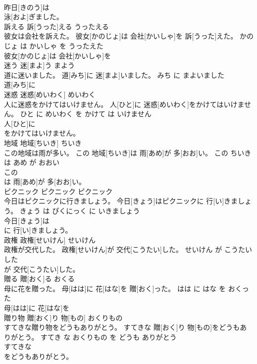 \documentclass[8pt]{extreport}
\begin{document}
\begin{CJK}{UTF8}{min}
\\	昨日[きのう]は
\\	泳[およ]ぎました。			
\\	訴える	訴[うった]える	うったえる	
\\	彼女は会社を訴えた。	彼女[かのじょ]は 会社[かいしゃ]を 訴[うった]えた。	かのじょ は かいしゃ を うったえた	
\\	彼女[かのじょ]は 会社[かいしゃ]を
\\	迷う	迷[まよ]う	まよう	
\\	道に迷いました。	道[みち]に 迷[まよ]いました。	みち に まよいました	
\\	道[みち]に
\\	迷惑	迷惑[めいわく]	めいわく	
\\	人に迷惑をかけてはいけません。	人[ひと]に 迷惑[めいわく]をかけてはいけません。	ひと に めいわく を かけて は いけません	
\\	人[ひと]に
\\	をかけてはいけません。			
\\	地域	地域[ちいき]	ちいき	
\\	この地域は雨が多い。	この 地域[ちいき]は 雨[あめ]が 多[おお]い。	この ちいき は あめ が おおい	
\\	この
\\	は 雨[あめ]が 多[おお]い。			
\\	ピクニック	ピクニック	ピクニック	
\\	今日はピクニックに行きましょう。	今日[きょう]はピクニックに 行[い]きましょう。	きょう は ぴくにっく に いきましょう	
\\	今日[きょう]は
\\	に 行[い]きましょう。			
\\	政権	政権[せいけん]	せいけん	
\\	政権が交代した。	政権[せいけん]が 交代[こうたい]した。	せいけん が こうたい した	
\\	が 交代[こうたい]した。			
\\	贈る	贈[おく]る	おくる	
\\	母に花を贈った。	母[はは]に 花[はな]を 贈[おく]った。	はは に はな を おくった	
\\	母[はは]に 花[はな]を
\\	贈り物	贈[おく]り 物[もの]	おくりもの	
\\	すてきな贈り物をどうもありがとう。	すてきな 贈[おく]り 物[もの]をどうもありがとう。	すてき な おくりもの を どうも ありがとう	
\\	すてきな
\\	をどうもありがとう。			

\end{CJK}
\end{document}
